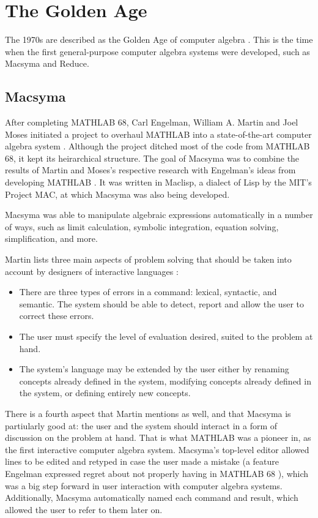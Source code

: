 \section{The Golden Age}\label{subsec:the-golden-age}

The 1970s are described as the Golden Age of computer algebra \parencite{davenport1994computer}. This is the time when the first general-purpose computer algebra systems were developed, such as Macsyma and Reduce. 

\subsection{Macsyma}\label{sec:macsyma}
After completing MATHLAB 68, Carl Engelman, William A. Martin and Joel Moses initiated a project to overhaul MATHLAB into a state-of-the-art computer algebra system \parencite{engelman1971legacy}. Although the project ditched most of the code from MATHLAB 68, it kept its heirarchical structure. The goal of Macsyma was to combine the results of Martin and Moses's respective research with Engelman's ideas from developing MATHLAB \parencite{martin1971macsyma}. It was written in Maclisp, a dialect of Lisp by the MIT's Project MAC, at which Macsyma was also being developed.

Macsyma was able to manipulate algebraic expressions automatically in a number of ways, such as limit calculation, symbolic integration, equation solving, simplification, and more.

Martin lists three main aspects of problem solving that should be taken into account by designers of interactive languages \parencite{martin1971macsyma}:

\begin{itemize}
    \item There are three types of errors in a command: lexical, syntactic, and semantic. The system should be able to detect, report and allow the user to correct these errors.
    \item The user must specify the level of evaluation desired, suited to the problem at hand.
    \item The system's language may be extended by the user either by renaming concepts already defined in the system, modifying concepts already defined in the system, or defining entirely new concepts.
\end{itemize}

There is a fourth aspect that Martin mentions as well, and that Macsyma is partiularly good at: the user and the system should interact in a form of discussion on the problem at hand. That is what MATHLAB was a pioneer in, as the first interactive computer algebra system. Macsyma's top-level editor allowed lines to be edited and retyped in case the user made a mistake \parencite{martin1971macsyma} (a feature Engelman expressed regret about not properly having in MATHLAB 68 \parencite{engelman1971legacy}), which was a big step forward in user interaction with computer algebra systems. Additionally, Macsyma automatically named each command and result, which allowed the user to refer to them later on.

